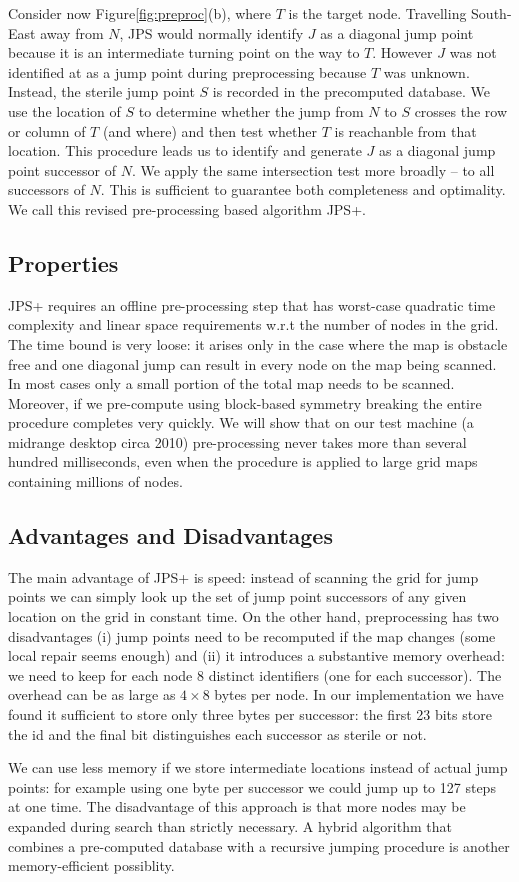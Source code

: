 Consider now Figure\ref{fig:preproc}(b), where $T$ is the target node.  
Travelling South-East away from $N$, JPS would normally identify 
$J$ as a diagonal jump point because it is an intermediate turning
point on the way to $T$.
However $J$ was not identified at as a jump point during preprocessing 
because $T$ was unknown.  
Instead, the sterile jump point $S$ is recorded in the precomputed 
database. We use the location of $S$ to determine whether the jump from 
$N$ to $S$ crosses the row or column of $T$ (and where) and then test 
whether $T$ is reachanble from that location. This procedure 
leads us to identify and generate $J$ as a diagonal jump point successor
of $N$. We apply the same intersection test more broadly -- to all 
successors of $N$. This is sufficient to guarantee both completeness 
and optimality. We call this revised pre-processing based algorithm 
JPS+.
\subsection*{Properties}
JPS+ requires an offline pre-processing step that has worst-case quadratic 
time complexity and linear space requirements w.r.t the number of nodes in 
the grid. The time bound is very loose: it arises only in the case 
where the map is obstacle free and one diagonal jump can result in
every node on the map being scanned. In most cases only a small portion
of the total map needs to be scanned. Moreover, if we pre-compute using block-based 
symmetry breaking the entire procedure completes very quickly.
We will show that on our test machine (a midrange desktop
circa 2010) pre-processing never takes more than several hundred milliseconds,
even when the procedure is applied to large grid maps containing millions
of nodes.
\subsection*{Advantages and Disadvantages}
The main advantage of JPS+ is speed: instead of scanning the grid for
jump points we can simply look up the set of jump point successors
of any given location on the grid in constant time.
On the other hand, preprocessing has two disadvantages (i) jump points need to be recomputed
if the map changes (some local repair seems enough) and (ii) it introduces 
a substantive memory overhead: we need to keep for each node 8 distinct 
identifiers (one for each successor). 
The overhead can be as large as $4\times8$ bytes per node. In our
implementation we have found it sufficient to store only three bytes 
per successor: the first 23 bits store the id and the final bit distinguishes
each successor as sterile or not. 
\par
We can use less memory if we
store intermediate locations instead of actual jump points: for example
using one byte per successor we could jump up to 127 steps 
at one time. The disadvantage of this approach is that more nodes may be 
expanded during search than strictly necessary. A hybrid 
algorithm that combines a pre-computed database with a recursive
jumping procedure is another memory-efficient possiblity.
